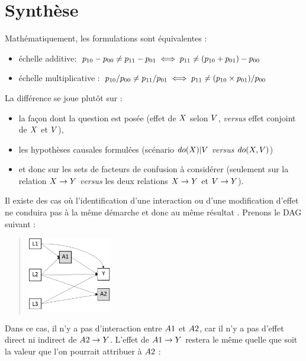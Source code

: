 \documentclass[
]{book}
\providecommand{\tightlist}{%
  \setlength{\itemsep}{0pt}\setlength{\parskip}{0pt}}
\begin{document}
\hypertarget{synthuxe8se}{%
\section{Synthèse}\label{synthuxe8se}}

Mathématiquement, les formulations sont équivalentes :

\begin{itemize}
\tightlist
\item
  échelle additive: \(\small p_{10} -p_{00} \neq p_{11}- p_{01} \iff p_{11} \neq (p_{10}+p_{01})- p_{00}\)
\item
  échelle multiplicative : \(\small p_{10} /p_{00} \neq p_{11}/ p_{01} \iff p_{11} \neq (p_{10} \times p_{01})/p_{00}\)
\end{itemize}

La différence se joue plutôt sur :

\begin{itemize}
\tightlist
\item
  la façon dont la question est posée (effet de \(\small X\) selon \(\small V\), \emph{versus} effet conjoint de \(\small X\) et \(\small V\)),
\item
  les hypothèses causales formulées (scénario \(\small do(X)|V\) \emph{versus} \(\small do(X,V)\))
\item
  et donc sur les sets de facteurs de confusion à considérer (seulement sur la relation \(\small X \rightarrow Y\) \emph{versus} les deux relations \(\small X \rightarrow Y\) et \(\small V \rightarrow Y\)).
\end{itemize}

Il existe des cas où l'identification d'une interaction ou d'une modification d'effet ne conduira pas à la même démarche et donc au même résultat \citet{vanderweele_distinction_2009}. Prenons le DAG suivant :

\begin{quote}
\includegraphics[width=0.3\textwidth,height=\textheight]{img/Image12.png}
\end{quote}

Dans ce cas, il n'y a pas d'interaction entre \(\small A1\) et \(\small A2\), car il n'y a pas d'effet direct ni indirect de \(\small A2 \rightarrow Y\). L'effet de \(\small A1 \rightarrow Y\) restera le même quelle que soit la valeur que l'on pourrait attribuer à \(\small A2\) :
\end{document}
